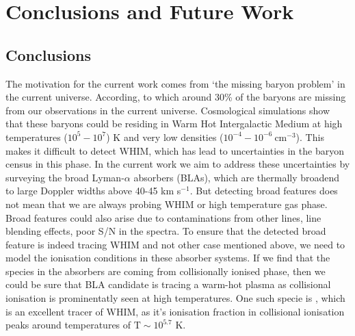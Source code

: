 \chapter{Conclusions and Future Work} \label{ch:conclusions}

\section{Conclusions}

The motivation for the current work comes from `the missing baryon problem' in the current universe. According, to which around 30\% of the baryons are missing from our observations in the current universe. Cosmological simulations show that these baryons could be residing in Warm Hot Intergalactic Medium at high temperatures ($10^5-10^7$) K and very low densities ($10^{-4} - 10^{-6} \ \text{cm}^{-3}$). This makes it difficult to detect WHIM, which has lead to uncertainties in the baryon census in this phase. In the current work we aim to address these uncertainties by surveying the broad Lyman-$\alpha$ absorbers (BLAs), which are thermally broadend to large Doppler widths above 40-45 km s$^{-1}$. But detecting broad features does not mean that we are always probing WHIM or high temperature gas phase. Broad features could also arise due to contaminations from other lines, line blending effects, poor S/N in the spectra. To ensure that the detected broad feature is indeed tracing WHIM and not other case mentioned above, we need to model the ionisation conditions in these absorber systems. If we find that the species in the absorbers are coming from collisionally ionised phase, then we could be sure that BLA candidate is tracing a warm-hot plasma as collisional ionisation is prominentatly seen at high temperatures. One such specie is , which is an excellent tracer of WHIM, as it's ionisation fraction in collisional ionisation peaks around temperatures of $\text{T} \sim 10^{5.7}$ K.   

